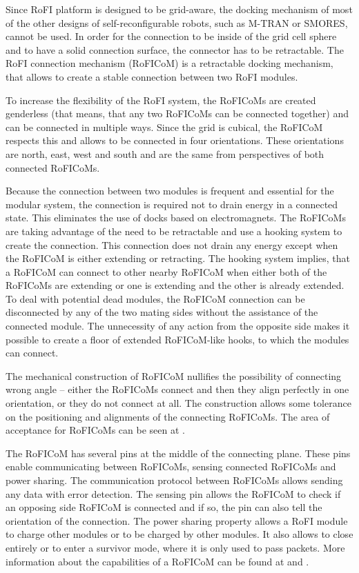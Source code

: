 \documentclass[
  digital, %
  table,   %
  oneside, %
  nolof,     %
  nolot,     %
]{fithesis3}
\begin{document}
Since RoFI platform is designed to be grid-aware, the docking mechanism of most of the other designs of self-reconfigurable robots, such as M-TRAN\cite{mtran} or SMORES\cite{smores}, cannot be used.
In order for the connection to be inside of the grid cell sphere and to have a solid connection surface, the connector has to be retractable.
The RoFI connection mechanism (RoFICoM) is a retractable docking mechanism, that allows to create a stable connection between two RoFI modules.

To increase the flexibility of the RoFI system, the RoFICoMs are created genderless (that means, that any two RoFICoMs can be connected together) and can be connected in multiple ways.
Since the grid is cubical, the RoFICoM respects this and allows to be connected in four orientations.
These orientations are north, east, west and south and are the same from perspectives of both connected RoFICoMs.

Because the connection between two modules is frequent and essential for the modular system, the connection is required not to drain energy in a connected state.
This eliminates the use of docks based on electromagnets.
The RoFICoMs are taking advantage of the need to be retractable and use a hooking system to create the connection.
This connection does not drain any energy except when the RoFICoM is either extending or retracting.
The hooking system implies, that a RoFICoM can connect to other nearby RoFICoM when either both of the RoFICoMs are extending or one is extending and the other is already extended.
To deal with potential dead modules, the RoFICoM connection can be disconnected by any of the two mating sides without the assistance of the connected module.
The unnecessity of any action from the opposite side makes it possible to create a floor of extended RoFICoM-like hooks, to which the modules can connect.

The mechanical construction of RoFICoM nullifies the possibility of connecting wrong angle -- either the RoFICoMs connect and then they align perfectly in one orientation, or they do not connect at all.
The construction allows some tolerance on the positioning and alignments of the connecting RoFICoMs.
The area of acceptance for RoFICoMs can be seen at \cite[p. 6]{roficom}.

The RoFICoM has several pins at the middle of the connecting plane.
These pins enable communicating between RoFICoMs, sensing connected RoFICoMs and power sharing.
The communication protocol between RoFICoMs allows sending any data with error detection.
The sensing pin allows the RoFICoM to check if an opposing side RoFICoM is connected and if so, the pin can also tell the orientation of the connection.
The power sharing property allows a RoFI module to charge other modules or to be charged by other modules.
It also allows to close entirely or to enter a survivor mode, where it is only used to pass packets.
More information about the capabilities of a RoFICoM can be found at \cite{roficom} and \cite{rofi-web}.
\end{document}
